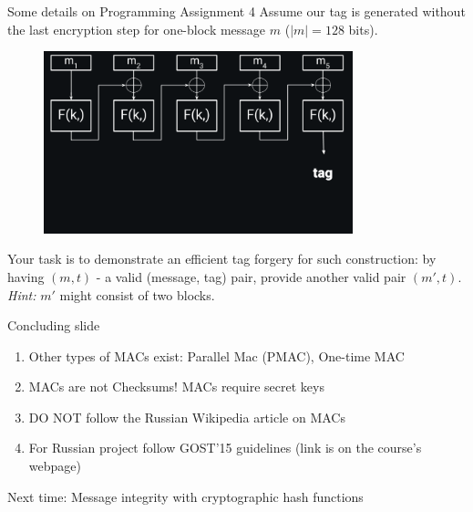 \documentclass[usenames,dvipsnames, 9pt]{beamer}
\begin{document}
\begin{frame}{Some details on Programming Assignment 4}
\Large
Assume our tag is generated without the last encryption step for one-block message $m $ ($|m|=128$ bits).
\begin{figure}
	\includegraphics[width=0.8\textwidth]{Raw_CBC_Mac} 
\end{figure}

\vspace{-30pt}
Your task is to demonstrate an efficient tag forgery for such construction: by having $(m,t)$ - a valid (message, tag) pair, provide another valid pair $(m', t)$. \\
\emph{Hint:} $m'$ might consist of two blocks.
	
\end{frame}

\begin{frame}{Concluding slide}
\LARGE
	\begin{enumerate}
		\itemsep 1em
		\item Other types of MACs exist: Parallel Mac (PMAC), One-time MAC
		\item MACs are not Checksums! MACs {\color{Orange} require} secret keys
		\item DO NOT follow the Russian Wikipedia article on MACs
		\item For Russian project follow GOST'15 guidelines (link is on the course's webpage)
	\end{enumerate}
\vspace{10pt}
Next time: Message integrity with cryptographic hash functions
\end{frame}
\end{document}
